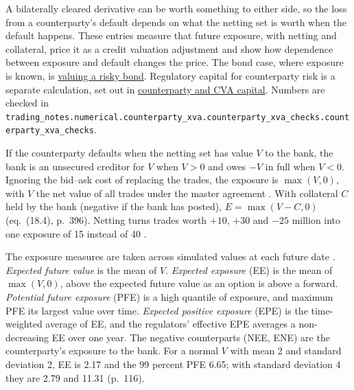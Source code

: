 A bilaterally cleared derivative can be worth something to either side, so the loss from a counterparty's default depends on what the netting set is worth when the default happens. These entries measure that future exposure, with netting and collateral, price it as a credit valuation adjustment and show how dependence between exposure and default changes the price. The bond case, where exposure is known, is \hyperref[meth:risky-bond-cva]{valuing a risky bond}. Regulatory capital for counterparty risk is a separate calculation, set out in \hyperref[rule:counterparty-credit-cva-capital]{counterparty and CVA capital}. Numbers are checked in \nolinkurl{trading_notes.numerical.counterparty_xva.counterparty_xva_checks.counterparty_xva_checks}.

\begin{qfdefinition}\label{def:counterparty-exposure-measures}
 If the counterparty defaults when the netting set has value $V$ to the bank, the bank is an unsecured creditor for $V$ when $V>0$ and owes $-V$ in full when $V<0$. Ignoring the bid--ask cost of replacing the trades, the exposure is $\max(V,0)$, with $V$ the net value of all trades under the master agreement \citep[chap.~18, sec.~18.1, pp.~394--395]{risk-management-financial-institutions-2023}. With collateral $C$ held by the bank (negative if the bank has posted), $E=\max(V-C,0)$ (eq.~(18.4), p.~396). Netting turns trades worth $+10$, $+30$ and $-25$ million into one exposure of 15 instead of 40 \citep[chap.~24, sec.~24.7, p.~574]{s7-hulloptions}.

The exposure measures are taken across simulated values at each future date \citep[chap.~7, sec.~7.2, pp.~114--119]{gregory-xva-challenge-2015}. \emph{Expected future value} is the mean of $V$. \emph{Expected exposure} (EE) is the mean of $\max(V,0)$, above the expected future value as an option is above a forward. \emph{Potential future exposure} (PFE) is a high quantile of exposure, and maximum PFE its largest value over time. \emph{Expected positive exposure} (EPE) is the time-weighted average of EE, and the regulators' effective EPE averages a non-decreasing EE over one year. The negative counterparts (NEE, ENE) are the counterparty's exposure to the bank. For a normal $V$ with mean 2 and standard deviation 2, EE is 2.17 and the 99 percent PFE 6.65; with standard deviation 4 they are 2.79 and 11.31 (p.~116).


\end{qfdefinition}
